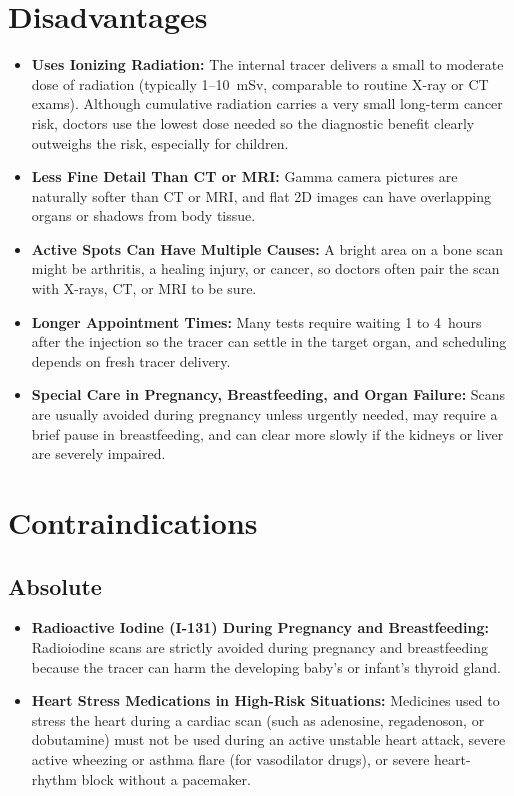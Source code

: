 \section{Disadvantages}
\begin{itemize}
\item \textbf{Uses Ionizing Radiation:} The internal tracer delivers a small to moderate dose of radiation (typically 1--10~mSv, comparable to routine X-ray or CT exams). Although cumulative radiation carries a very small long-term cancer risk, doctors use the lowest dose needed so the diagnostic benefit clearly outweighs the risk, especially for children.
\item \textbf{Less Fine Detail Than CT or MRI:} Gamma camera pictures are naturally softer than CT or MRI, and flat 2D images can have overlapping organs or shadows from body tissue.
\item \textbf{Active Spots Can Have Multiple Causes:} A bright area on a bone scan might be arthritis, a healing injury, or cancer, so doctors often pair the scan with X-rays, CT, or MRI to be sure.
\item \textbf{Longer Appointment Times:} Many tests require waiting 1 to 4~hours after the injection so the tracer can settle in the target organ, and scheduling depends on fresh tracer delivery.
\item \textbf{Special Care in Pregnancy, Breastfeeding, and Organ Failure:} Scans are usually avoided during pregnancy unless urgently needed, may require a brief pause in breastfeeding, and can clear more slowly if the kidneys or liver are severely impaired.
\end{itemize}

\section{Contraindications}

\subsection{Absolute}
\begin{itemize}
\item \textbf{Radioactive Iodine (I-131) During Pregnancy and Breastfeeding:} Radioiodine scans are strictly avoided during pregnancy and breastfeeding because the tracer can harm the developing baby's or infant's thyroid gland.
\item \textbf{Heart Stress Medications in High-Risk Situations:} Medicines used to stress the heart during a cardiac scan (such as adenosine, regadenoson, or dobutamine) must not be used during an active unstable heart attack, severe active wheezing or asthma flare (for vasodilator drugs), or severe heart-rhythm block without a pacemaker.
\end{itemize}

